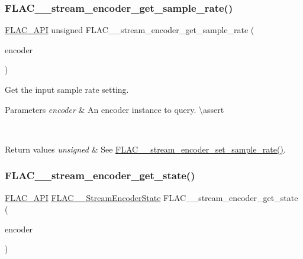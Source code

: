 \subsubsection{\texorpdfstring{FLAC\_\_stream\_encoder\_get\_sample\_rate()}{FLAC\_\_stream\_encoder\_get\_sample\_rate()}}
{\footnotesize\ttfamily \mbox{\hyperlink{group__flac__export_ga56ca07df8a23310707732b1c0007d6f5}{F\+L\+A\+C\+\_\+\+A\+PI}} unsigned F\+L\+A\+C\+\_\+\+\_\+stream\+\_\+encoder\+\_\+get\+\_\+sample\+\_\+rate (\begin{DoxyParamCaption}\item[{const \mbox{\hyperlink{struct_f_l_a_c_____stream_encoder}{F\+L\+A\+C\+\_\+\+\_\+\+Stream\+Encoder}} $\ast$}]{encoder }\end{DoxyParamCaption})}

Get the input sample rate setting.


\begin{DoxyParams}{Parameters}
{\em encoder} & An encoder instance to query. \textbackslash{}assert 
\begin{DoxyCode}{1}
\end{DoxyCode}
 \\
\hline
\end{DoxyParams}

\begin{DoxyRetVals}{Return values}
{\em unsigned} & See \mbox{\hyperlink{group__flac__stream__encoder_ga108c3f4fbdcaa744ddbb125f91cb3838}{F\+L\+A\+C\+\_\+\+\_\+stream\+\_\+encoder\+\_\+set\+\_\+sample\+\_\+rate()}}. \\
\hline
\end{DoxyRetVals}
\mbox{\label{group__flac__stream__encoder_gaff7284e55f01b59ed8f03317df510992}} 
\subsubsection{\texorpdfstring{FLAC\_\_stream\_encoder\_get\_state()}{FLAC\_\_stream\_encoder\_get\_state()}}
{\footnotesize\ttfamily \mbox{\hyperlink{group__flac__export_ga56ca07df8a23310707732b1c0007d6f5}{F\+L\+A\+C\+\_\+\+A\+PI}} \mbox{\hyperlink{group__flac__stream__encoder_gac5e9db4fc32ca2fa74abd9c8a87c02a5}{F\+L\+A\+C\+\_\+\+\_\+\+Stream\+Encoder\+State}} F\+L\+A\+C\+\_\+\+\_\+stream\+\_\+encoder\+\_\+get\+\_\+state (\begin{DoxyParamCaption}\item[{const \mbox{\hyperlink{struct_f_l_a_c_____stream_encoder}{F\+L\+A\+C\+\_\+\+\_\+\+Stream\+Encoder}} $\ast$}]{encoder }\end{DoxyParamCaption})}

